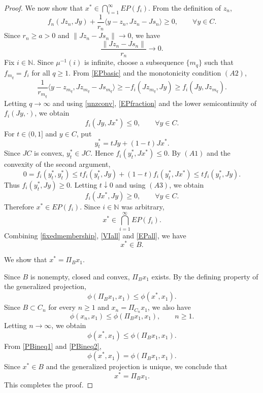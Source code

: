 \documentclass[leqno,12pt]{amsart}
\theoremstyle{definition}
\numberwithin{equation}{section}
\begin{document}
\begin{proof}
We now show that $x^{*}\in \bigcap_{i=1}^{\infty}EP(f_i)$. From the definition of $z_n$,
\begin{equation}\label{EPbasic}
f_n(Jz_n,Jy)+\frac{1}{r_n}\langle y-z_n,Jz_n-Js_n\rangle\geq 0,
\qquad \forall y\in C.
\end{equation}
Since $r_n\geq a>0$ and $\|Jz_n-Js_n\|\to 0$, we have
\begin{equation}\label{EPfraction}
\frac{\|Jz_n-Js_n\|}{r_n}\to 0.
\end{equation}
Fix $i\in\mathbb{N}$. Since $\mu^{-1}(i)$ is infinite, choose a subsequence $\{m_q\}$ such that $f_{m_q}=f_i$ for all $q\geq 1$. From \eqref{EPbasic} and the monotonicity condition $(A2)$,
\[
\frac{1}{r_{m_q}}\langle y-z_{m_q},Jz_{m_q}-Js_{m_q}\rangle\geq -f_i(Jz_{m_q},Jy)\geq f_i(Jy,Jz_{m_q}).
\]
Letting $q\to\infty$ and using \eqref{unzconv}, \eqref{EPfraction} and the lower semicontinuity of $f_i(Jy,\cdot)$, we obtain
\[
f_i(Jy,Jx^{*})\leq 0,
\qquad \forall y\in C.
\]
For $t\in(0,1]$ and $y\in C$, put
\[
y_t^{*}=tJy+(1-t)Jx^{*}.
\]
Since $JC$ is convex, $y_t^{*}\in JC$. Hence $f_i(y_t^{*},Jx^{*})\leq 0$. By $(A1)$ and the convexity of the second argument,
\[
0=f_i(y_t^{*},y_t^{*})\leq t f_i(y_t^{*},Jy)+(1-t)f_i(y_t^{*},Jx^{*})\leq t f_i(y_t^{*},Jy).
\]
Thus $f_i(y_t^{*},Jy)\geq 0$. Letting $t\downarrow 0$ and using $(A3)$, we obtain
\[
f_i(Jx^{*},Jy)\geq 0,
\qquad \forall y\in C.
\]
Therefore $x^{*}\in EP(f_i)$. Since $i\in\mathbb{N}$ was arbitrary,
\begin{equation}\label{EPall}
x^{*}\in \bigcap_{i=1}^{\infty}EP(f_i).
\end{equation}
Combining \eqref{fixedmembership}, \eqref{VIall} and \eqref{EPall}, we have
\begin{equation}\label{xinstarB}
x^{*}\in B.
\end{equation}

 We show that $x^{*}=\Pi_Bx_1$.

Since $B$ is nonempty, closed and convex, $\Pi_Bx_1$ exists. By the defining property of the generalized projection,
\begin{equation}\label{PBineq1}
\phi(\Pi_Bx_1,x_1)\leq \phi(x^{*},x_1).
\end{equation}
Since $B\subset C_n$ for every $n\geq 1$ and $x_n=\Pi_{C_n}x_1$, we also have
\[
\phi(x_n,x_1)\leq \phi(\Pi_Bx_1,x_1),
\qquad n\geq 1.
\]
Letting $n\to\infty$, we obtain
\begin{equation}\label{PBineq2}
\phi(x^{*},x_1)\leq \phi(\Pi_Bx_1,x_1).
\end{equation}
From \eqref{PBineq1} and \eqref{PBineq2},
\[
\phi(x^{*},x_1)=\phi(\Pi_Bx_1,x_1).
\]
Since $x^{*}\in B$ and the generalized projection is unique, we conclude that
\[
x^{*}=\Pi_Bx_1.
\]
This completes the proof.
\end{proof}
\end{document}
